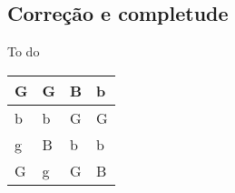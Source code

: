     
    \subsection{Correção e completude}
    To do
    
    
    \begin{table}[htb]
      \centering
      \begin{tabular}{|l|l|l|l|}
      \hline
      G          & G          & B     &b           \\ \hline
      b          & b          & G     &G           \\ \hline
      g          & B          & b     &b            \\ \hline
      G          & g          & G     &B            \\ \hline
      
      \end{tabular}
      \end{table}

